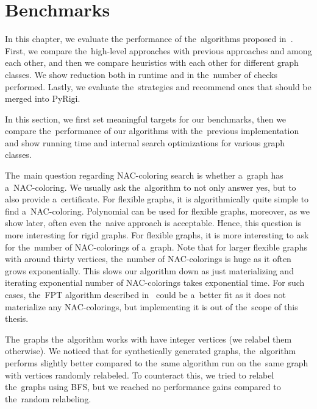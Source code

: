 \chapter{Benchmarks}%
\label{chapter:benchmarks}

\begin{chapterabstract}

	In this chapter,
	we evaluate the performance of the~algorithms
	proposed in~.
	First, we compare the~high-level approaches with previous approaches and among each other,
	and then we compare heuristics with each other
	for different graph classes.
	We show reduction both in runtime and in the~number
	of \IsNACColoring{} checks performed.
	Lastly, we evaluate the~strategies and
	recommend ones that should be merged into PyRigi.

\end{chapterabstract}

In this section, we first set meaningful targets for our benchmarks,
then we compare the~performance of our algorithms with the~previous implementation
and show running time and internal search optimizations for various graph classes.

The~main question regarding NAC-coloring search is whether a~graph has a~NAC-coloring.
We usually ask the~algorithm to not only answer yes, but to also provide a~certificate.
%
For flexible graphs, it is algorithmically quite simple to find a~NAC-coloring.
Polynomial 
can be used for flexible graphs,
 moreover, as we show later, often even the~naive approach is acceptable.
Hence, this question is more interesting for rigid graphs.
%
For flexible graphs, it is more interesting to ask for the~number of NAC-colorings
of a~graph.
Note that for larger flexible graphs with around thirty vertices,
the~number of NAC-colorings is huge as it often grows exponentially.
This slows our algorithm down as just materializing and iterating exponential
number of NAC-colorings takes exponential time.
%
For such cases, the~FPT algorithm described in~
could be a~better fit as it does not materialize any NAC-colorings,
but implementing it is out of the~scope of this thesis.

The~graphs the~algorithm works with have integer vertices (we relabel them otherwise).
We noticed that for synthetically generated graphs,
the~algorithm performs slightly better compared to
the~same algorithm run on the~same graph with vertices randomly relabeled.
To counteract this, we tried to relabel the~graphs using BFS,
but we reached no performance gains compared to the~random relabeling.

